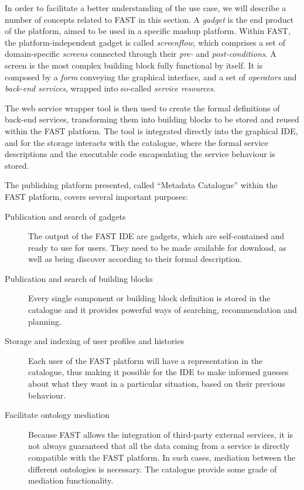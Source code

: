In order to facilitate a better understanding of the use case, we will describe a number of concepts related to FAST in this section. A \emph{gadget} is the end product of the platform, aimed to be used in a specific mashup platform. Within FAST, the platform-independent gadget is called \emph{screenflow}, which comprises a set of domain-specific \emph{screens} connected through their \emph{pre-} and \emph{post-conditions}. A screen is the most complex building block fully functional by itself. It is composed by a \emph{form} conveying the graphical interface, and a set of \emph{operators} and \emph{back-end services}, wrapped into so-called \emph{service resources}.

The web service wrapper tool is then used to create the formal definitions of back-end services, transforming them into building blocks to be stored and reused within the FAST platform. The tool is integrated directly into the graphical IDE, and for the storage interacts with the catalogue, where the formal service descriptions and the executable code encapsulating the service behaviour is stored.

The publishing platform presented, called ``Metadata Catalogue'' within the FAST platform, covers several important purposes:
\begin{description}
	\item[Publication and search of gadgets] The output of the FAST IDE are gadgets, which are self-contained and ready to use for users. They need to be made available for download, as well as being discover according to their formal description.
	\item[Publication and search of building blocks] Every single component or building block definition is stored in the catalogue and it provides powerful ways of searching, recommendation and planning. 
	\item[Storage and indexing of user profiles and histories] Each user of the FAST platform will have a representation in the catalogue, thus making it possible for the IDE to make informed guesses about what they want in a particular situation, based on their previous behaviour.
	\item[Facilitate ontology mediation] Because FAST allows the integration of third-party external services, it is not always guaranteed that all the data coming from a service is directly compatible with the FAST platform. In such cases, mediation between the different ontologies is necessary. The catalogue provide some grade of mediation functionality.
\end{description}

